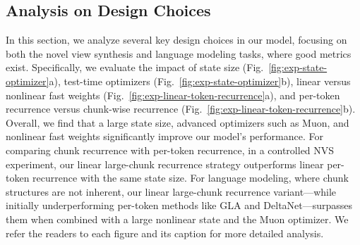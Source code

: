 \subsection{Analysis on Design Choices}\label{sec:analysis}




In this section, we analyze several key design choices in our model, focusing on both the novel view synthesis and language modeling tasks, where good metrics exist. Specifically, we evaluate the 
impact of state size (Fig.~\ref{fig:exp-state-optimizer}a), 
test-time optimizers (Fig.~\ref{fig:exp-state-optimizer}b),
linear versus nonlinear fast weights (Fig.~\ref{fig:exp-linear-token-recurrence}a), and 
per-token recurrence versus chunk-wise recurrence (Fig.~\ref{fig:exp-linear-token-recurrence}b).
Overall, we find that a large state size, advanced optimizers such as Muon, and nonlinear fast weights significantly improve our model’s performance. For comparing chunk recurrence with per-token recurrence, in a controlled NVS experiment, our linear large-chunk recurrence strategy outperforms linear per-token recurrence with the same state size. For language modeling, where chunk structures are not inherent, our linear large-chunk recurrence variant—while initially underperforming per-token methods like GLA and DeltaNet—surpasses them when combined with a large nonlinear state and the Muon optimizer.
We refer the readers to each figure and its caption for more detailed analysis. 


